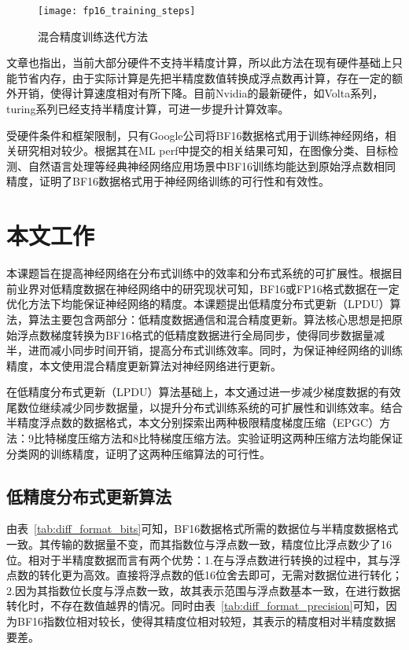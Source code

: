 \begin{figure}[htp]
\centering
\texttt{[image: fp16\_training\_steps]}
\caption{混合精度训练迭代方法}
\label{fig:fp16_training_steps}
\end{figure}
文章也指出，当前大部分硬件不支持半精度计算，所以此方法在现有硬件基础上只能节省内存，由于实际计算是先把半精度数值转换成浮点数再计算，存在一定的额外开销，使得计算速度相对有所下降。目前Nvidia的最新硬件，如Volta系列，turing系列已经支持半精度计算，可进一步提升计算效率。

受硬件条件和框架限制，只有Google公司将BF16数据格式用于训练神经网络，相关研究相对较少。根据其在ML perf中提交的相关结果可知，在图像分类、目标检测、自然语言处理等经典神经网络应用场景中BF16训练均能达到原始浮点数相同精度，证明了BF16数据格式用于神经网络训练的可行性和有效性。

\section{本文工作}
本课题旨在提高神经网络在分布式训练中的效率和分布式系统的可扩展性。根据目前业界对低精度数据在神经网络中的研究现状可知，BF16或FP16格式数据在一定优化方法下均能保证神经网络的精度。本课题提出低精度分布式更新（LPDU）算法，算法主要包含两部分：低精度数据通信和混合精度更新。算法核心思想是把原始浮点数梯度转换为BF16格式的低精度数据进行全局同步，使得同步数据量减半，进而减小同步时间开销，提高分布式训练效率。同时，为保证神经网络的训练精度，本文使用混合精度更新算法对神经网络进行更新。

在低精度分布式更新（LPDU）算法基础上，本文通过进一步减少梯度数据的有效尾数位继续减少同步数据量，以提升分布式训练系统的可扩展性和训练效率。结合半精度浮点数的数据格式，本文分别探索出两种极限精度梯度压缩（EPGC）方法：9比特梯度压缩方法和8比特梯度压缩方法。实验证明这两种压缩方法均能保证分类网的训练精度，证明了这两种压缩算法的可行性。

\subsection{低精度分布式更新算法}
由表~\ref{tab:diff_format_bits}可知，BF16数据格式所需的数据位与半精度数据格式一致。其传输的数据量不变，而其指数位与浮点数一致，精度位比浮点数少了16位。相对于半精度数据而言有两个优势：1.在与浮点数进行转换的过程中，其与浮点数的转化更为高效。直接将浮点数的低16位舍去即可，无需对数据位进行转化；2.因为其指数位长度与浮点数一致，故其表示范围与浮点数基本一致，在进行数据转化时，不存在数值越界的情况。同时由表~\ref{tab:diff_format_precision}可知，因为BF16指数位相对较长，使得其精度位相对较短，其表示的精度相对半精度数据要差。

